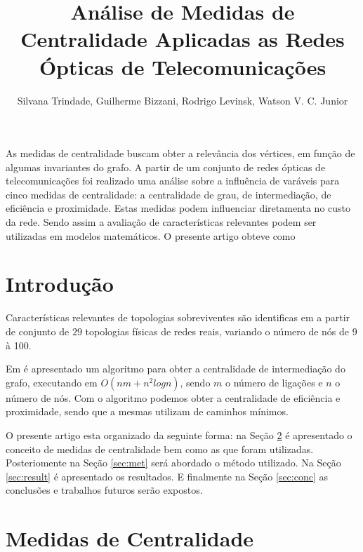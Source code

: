 \documentclass[12pt]{article}
\title{Análise de Medidas de Centralidade Aplicadas as Redes Ópticas de Telecomunicações}
\author{Silvana Trindade\inst{1}, Guilherme Bizzani\inst{1}, Rodrigo Levinsk\inst{1}, Watson V. C. Junior\inst{1}}
\begin{document}
 

\maketitle

\begin{abstract}
 
\end{abstract}
\begin{resumo} 
As medidas de centralidade buscam obter a relevância dos vértices, em função de algumas invariantes do grafo.
 A partir de um conjunto de redes ópticas de telecomunicações foi realizado uma análise sobre a influência de varáveis para cinco medidas de centralidade: a centralidade de grau, de intermediação, de eficiência e proximidade.
 Estas medidas podem influenciar diretamenta no custo da rede.
 Sendo assim a avaliação de características relevantes podem ser utilizadas em modelos matemáticos.
O presente artigo obteve como  

\end{resumo}


\section{Introdução}

Características relevantes de topologias sobreviventes são identificas em \cite{pavan} a partir de conjunto de $29$ topologias físicas de redes reais, variando o número de nós de 9 à 100.

Em \cite{Brandes01afaster} é apresentado um algoritmo para obter a centralidade de intermediação do grafo, executando em $O(nm + n^2 log n)$, sendo $m$ o número de ligações e $n$ o número de nós.
Com o algoritmo podemos obter a centralidade de eficiência e proximidade, sendo que a mesmas utilizam de caminhos mínimos.

O presente artigo esta organizado da seguinte forma: na Seção \ref{sec:mc} é apresentado o conceito de medidas de centralidade bem como as que foram utilizadas.
Posteriomente na  Seção \ref{sec:met} será abordado o método utilizado. 
Na Seção \ref{sec:result} é apresentado os resultados.
E finalmente na Seção \ref{sec:conc} as conclusões e trabalhos futuros serão expostos. 

\section{Medidas de Centralidade}\label{sec:mc}
\end{document}
